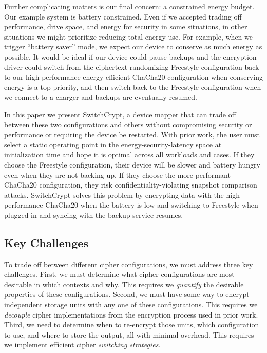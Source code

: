 Further complicating matters is our final concern: a constrained energy budget.
Our example system is battery constrained. Even if we accepted trading off
performance, drive space, and energy for security in some situations, in other
situations we might prioritize reducing total energy use. For example, when we
trigger ``battery saver'' mode, we expect our device to conserve as much energy
as possible. It would be ideal if our device could pause backups and the
encryption driver could switch from the ciphertext-randomizing Freestyle
configuration back to our high performance energy-efficient ChaCha20
configuration when conserving energy is a top priority, and then switch back to
the Freestyle configuration when we connect to a charger and backups are
eventually resumed.

In this paper we present SwitchCrypt, a device mapper that can trade off between
these two configurations and others without compromising security or performance
or requiring the device be restarted. With prior work, the user must select a
static operating point in the energy-security-latency space at initialization
time and hope it is optimal across all workloads and cases. If they choose the
Freestyle configuration, their device will be slower and battery hungry even
when they are not backing up. If they choose the more performant ChaCha20
configuration, they risk confidentiality-violating snapshot comparison attacks.
SwitchCrypt solves this problem by encrypting data with the high performance
ChaCha20 when the battery is low and switching to Freestyle when plugged in and
syncing with the backup service resumes.

\subsection{Key Challenges}

To trade off between different cipher configurations, we must address three key
challenges. First, we must determine what cipher configurations are most
desirable in which contexts and why. This requires we \emph{quantify} the
desirable properties of these configurations. Second, we must have some way to
encrypt independent storage units with any one of these configurations. This
requires we \emph{decouple} cipher implementations from the encryption process
used in prior work. Third, we need to determine when to re-encrypt those units,
which configuration to use, and where to store the output, all with minimal
overhead. This requires we implement efficient cipher \emph{switching
strategies}.


